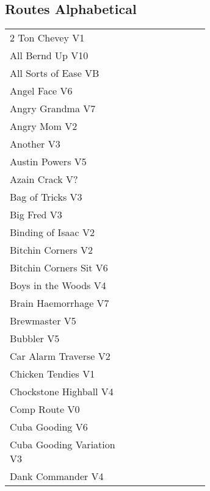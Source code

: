 \twocolumn
{}
\begin{flushleft}
\section{Routes Alphabetical}
\begin{center}
\begin{supertabular}{p{0.65\linewidth}r}
2 Ton Chevey V1 & \pageref{rt:2 Ton Chevey} \\
All Bernd Up V10 & \pageref{rt:All Bernd Up} \\
All Sorts of Ease VB & \pageref{rt:All Sorts of Ease} \\
Angel Face V6 & \pageref{rt:Angel Face} \\
Angry Grandma V7 & \pageref{rt:Angry Grandma} \\
Angry Mom V2 & \pageref{rt:Angry Mom} \\
Another V3 & \pageref{rt:Another} \\
Austin Powers V5 & \pageref{rt:Austin Powers} \\
Azain Crack V? & \pageref{rt:Azain Crack} \\
Bag of Tricks V3 & \pageref{vr:Bag of Tricks} \\
Big Fred V3 & \pageref{rt:Big Fred} \\
Binding of Isaac V2 & \pageref{rt:Binding of Isaac} \\
Bitchin Corners V2 & \pageref{rt:Bitchin Corners} \\
Bitchin Corners Sit V6 & \pageref{vr:Bitchin Corners Sit} \\
Boys in the Woods V4 & \pageref{rt:Boys in the Woods} \\
Brain Haemorrhage V7 & \pageref{vr:Brain Haemorrhage} \\
Brewmaster V5 & \pageref{rt:Brewmaster} \\
Bubbler V5 & \pageref{rt:Bubbler} \\
Car Alarm Traverse V2 & \pageref{rt:Car Alarm Traverse} \\
Chicken Tendies V1 & \pageref{rt:Chicken Tendies} \\
Chockstone Highball V4 & \pageref{rt:Chockstone Highball} \\
Comp Route V0 & \pageref{rt:Comp Route} \\
Cuba Gooding V6 & \pageref{rt:Cuba Gooding} \\
Cuba Gooding Variation V3 & \pageref{vr:Cuba Gooding Variation} \\
Dank Commander V4 & \pageref{rt:Dank Commander} \\

\end{supertabular}
\end{center}
\end{flushleft}
